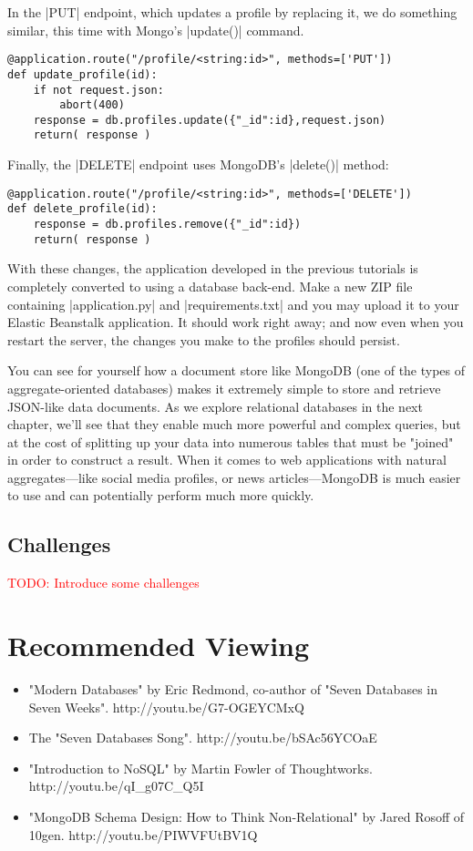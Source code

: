 \documentclass[11pt]{book}
\newcommand{\todo}[1]{\textcolor{red}{TODO: #1}} %
\begin{document}
In the |PUT| endpoint, which updates a profile by replacing it, we do something similar, this time with Mongo's |update()| command.

\begin{verbatim}
@application.route("/profile/<string:id>", methods=['PUT'])
def update_profile(id):
    if not request.json:
        abort(400)
    response = db.profiles.update({"_id":id},request.json)
    return( response )
\end{verbatim}

Finally, the |DELETE| endpoint uses MongoDB's |delete()| method:

\begin{verbatim}
@application.route("/profile/<string:id>", methods=['DELETE'])
def delete_profile(id):
    response = db.profiles.remove({"_id":id})
    return( response )
\end{verbatim}

With these changes, the application developed in the previous tutorials is completely converted to using a database back-end.  Make a new ZIP file containing |application.py| and |requirements.txt| and you may upload it to your Elastic Beanstalk application.  It should work right away; and now even when you restart the server, the changes you make to the profiles should persist.

You can see for yourself how a document store like MongoDB (one of the types of aggregate-oriented databases) makes it extremely simple to store and retrieve JSON-like data documents.  As we explore relational databases in the next chapter, we'll see that they enable much more powerful and complex queries, but at the cost of splitting up your data into numerous tables that must be "joined" in order to construct a result.  When it comes to web applications with natural aggregates---like social media profiles, or news articles---MongoDB is much easier to use and can potentially perform much more quickly.

\subsection*{Challenges}

\todo{Introduce some challenges}

\section*{Recommended Viewing}
\begin{itemize}
    \item "Modern Databases" by Eric Redmond, co-author of "Seven Databases in Seven Weeks".  http://youtu.be/G7-OGEYCMxQ
    \item The "Seven Databases Song".  http://youtu.be/bSAc56YCOaE
    \item "Introduction to NoSQL" by Martin Fowler of Thoughtworks.\\ http://youtu.be/qI\_g07C\_Q5I
    \item "MongoDB Schema Design: How to Think Non-Relational" by Jared Rosoff of 10gen.  http://youtu.be/PIWVFUtBV1Q
\end{itemize}
\end{document}
